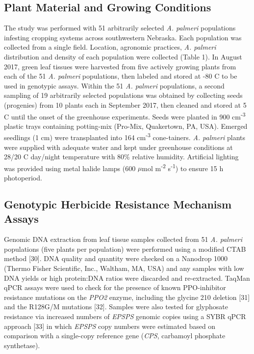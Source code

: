 \documentclass[10pt,letterpaper]{article}
\begin{document}
\hypertarget{plant-material-and-growing-conditions}{%
\subsection{Plant Material and Growing
Conditions}\label{plant-material-and-growing-conditions}}

The study was performed with 51 arbitrarily selected \emph{A. palmeri}
populations infesting cropping systems across southwestern Nebraska.
Each population was collected from a single field. Location, agronomic
practices, \emph{A. palmeri} distribution and density of each population
were collected (Table 1). In August 2017, green leaf tissues were
harvested from five actively growing plants from each of the 51 \emph{A.
palmeri} populations, then labeled and stored at -80 C to be used in
genotypic assays. Within the 51 \emph{A. palmeri} populations, a second
sampling of 19 arbitrarily selected populations was obtained by
collecting seeds (progenies) from 10 plants each in September 2017, then
cleaned and stored at 5 C until the onset of the greenhouse experiments.
Seeds were planted in 900 cm\textsuperscript{-3} plastic trays
containing potting-mix (Pro-Mix\textsuperscript \textregistered,
Quakertown, PA, USA). Emerged seedlings (1 cm) were transplanted into
164 cm\textsuperscript{-3} cone-tainers. \emph{A. palmeri} plants were
supplied with adequate water and kept under greenhouse conditions at
28/20 C day/night temperature with 80\% relative humidity. Artificial
lighting was provided using metal halide lamps (600 \(\mu\)mol
m\textsuperscript{-2} s\textsuperscript{-1}) to ensure 15 h photoperiod.

\hypertarget{genotypic-herbicide-resistance-mechanism-assays}{%
\subsection{Genotypic Herbicide Resistance Mechanism
Assays}\label{genotypic-herbicide-resistance-mechanism-assays}}

Genomic DNA extraction from leaf tissue samples collected from 51
\emph{A. palmeri} populations (five plants per population) were
performed using a modified CTAB method {[}30{]}. DNA quality and
quantity were checked on a Nanodrop 1000 (Thermo Fisher Scientific,
Inc., Waltham, MA, USA) and any samples with low DNA yields or high
protein:DNA ratios were discarded and re-extracted. TaqMan qPCR assays
were used to check for the presence of known PPO-inhibitor resistance
mutations on the \emph{PPO2} enzyme, including the glycine 210 deletion
{[}31{]} and the R128G/M mutations {[}32{]}. Samples were also tested
for glyphosate resistance via increased numbers of \emph{EPSPS} genomic
copies using a SYBR qPCR approach {[}33{]} in which \emph{EPSPS} copy
numbers were estimated based on comparison with a single-copy reference
gene (\emph{CPS}, carbamoyl phosphate synthetase).
\end{document}
